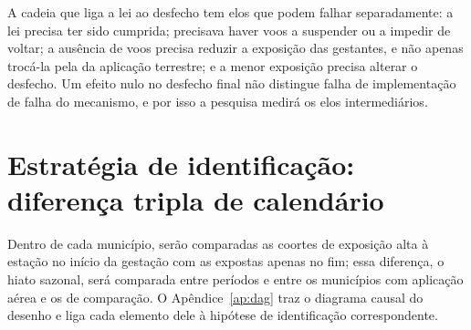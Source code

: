 A cadeia que liga a lei ao desfecho tem elos que podem falhar separadamente: a
lei precisa ter sido cumprida; precisava haver voos a suspender ou a impedir
de voltar; a ausência de voos precisa reduzir a exposição das gestantes, e não
apenas trocá-la pela da aplicação terrestre; e a menor exposição precisa
alterar o desfecho. Um efeito nulo no desfecho final não distingue falha de
implementação de falha do mecanismo, e por isso a pesquisa medirá os elos
intermediários.

\section{Estratégia de identificação: diferença tripla de calendário}
\label{sec:calendario}

Dentro de cada município, serão comparadas as coortes de exposição alta à
estação no início da gestação com as expostas apenas no fim; essa diferença, o
hiato sazonal, será comparada entre períodos e entre os municípios com
aplicação aérea e os de comparação. O Apêndice~\ref{ap:dag} traz o diagrama
causal do desenho e liga cada elemento dele à hipótese de identificação
correspondente.

